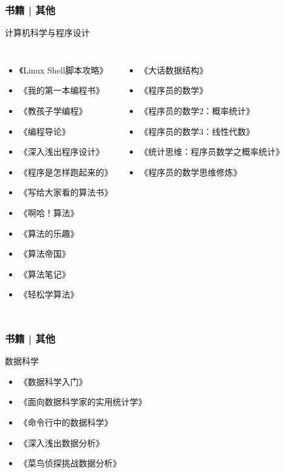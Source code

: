 \begin{frame}
  \frametitle{书籍 | 其他}
  \begin{block}{计算机科学与程序设计}
    \begin{columns}
    \begin{itemize}
      \item \alert{《Linux Shell脚本攻略》}
      \item 《我的第一本编程书》
      \item 《教孩子学编程》
      \item 《编程导论》
      \item 《深入浅出程序设计》
      \item 《程序是怎样跑起来的》
      \item 《写给大家看的算法书》
      \item 《啊哈！算法》
      \item 《算法的乐趣》
      \item 《算法帝国》
      \item 《算法笔记》
      \item 《轻松学算法》
    \end{itemize}
    \begin{itemize}
      \item 《大话数据结构》
      \item 《程序员的数学》
      \item 《程序员的数学2：概率统计》
      \item 《程序员的数学3：线性代数》
      \item 《统计思维：程序员数学之概率统计》
      \item 《程序员的数学思维修炼》
    \end{itemize}
  \end{columns}
  \end{block}
\end{frame}

\begin{frame}
  \frametitle{书籍 | 其他}
    \begin{block}{数据科学}
      \begin{itemize}
        \item 《数据科学入门》
        \item 《面向数据科学家的实用统计学》
        \item 《命令行中的数据科学》
        \item 《深入浅出数据分析》
        \item 《菜鸟侦探挑战数据分析》
      \end{itemize}
  \end{block}
\end{frame}

